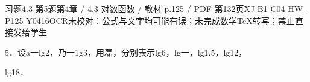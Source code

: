 \begin{bankitem}{习题4.3 第5题}{第4章 / 4.3 对数函数 / 教材 p.125 / PDF 第132页}{XJ-B1-C04-HW-P125-Y0416}{OCR未校对：公式与文字均可能有误；未完成数学TeX转写；禁止直接发给学生}
\begin{ocrdraft}
\par
5．设a一lg2，乃一1g3，用磊，分别表示lg6，lg一，lg1.5，lg12，
\par
lg18．
\end{ocrdraft}
\end{bankitem}
